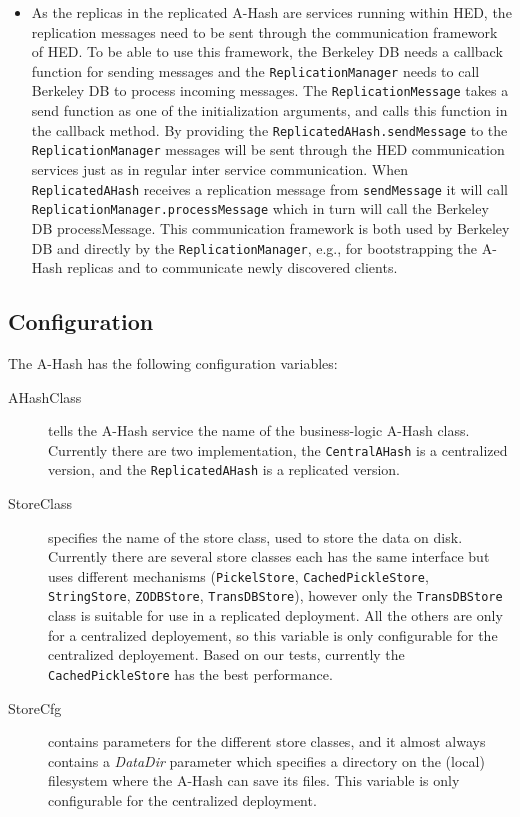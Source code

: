 \documentclass{book}
\begin{document}
\begin{description}
\begin{itemize}
	\item As the replicas in the replicated A-Hash are services running within HED, the replication messages need to be sent through the communication framework of HED. To be able to use this framework, the Berkeley DB needs a callback function for sending messages and the \verb!ReplicationManager! needs to call Berkeley DB to process incoming messages. The \verb!ReplicationMessage! takes a send function as one of the initialization arguments, and calls this function in the callback method. By providing the \verb!ReplicatedAHash.sendMessage! to the \verb!ReplicationManager! messages will be sent through the HED communication services just as in regular inter service communication. When \verb!ReplicatedAHash! receives a replication message from \verb!sendMessage! it will call \verb!ReplicationManager.processMessage! which in turn will call the Berkeley DB processMessage. This communication framework is both used by Berkeley DB and directly by the \verb!ReplicationManager!, e.g., for bootstrapping the A-Hash replicas and to communicate newly discovered clients.
\end{itemize}
\end{description}


\subsection{Configuration} %
\label{sub:a_hash_configuration}


The A-Hash has the following configuration variables:

\begin{description}
    \item[AHashClass] tells the A-Hash service the name of the business-logic A-Hash class. Currently there are two implementation, the \verb!CentralAHash! is a centralized version, and the \verb!ReplicatedAHash! is a replicated version.
    \item[StoreClass] specifies the name of the store class, used to store the data on disk. Currently there are several store classes each has the same interface but uses different mechanisms (\verb!PickelStore!, \verb!CachedPickleStore!, \verb!StringStore!, \verb!ZODBStore!, \verb!TransDBStore!), however only the \verb!TransDBStore! class is suitable for use in a replicated deployment. All the others are only for a centralized deployement, so this variable is only configurable for the centralized deployement. Based on our tests, currently the \verb!CachedPickleStore! has the best performance.
    \item[StoreCfg] contains parameters for the different store classes, and it almost always contains a \emph{DataDir} parameter which specifies a directory on the (local) filesystem where the A-Hash can save its files. This variable is only configurable for the centralized deployment.
\end{description}
\end{document}
